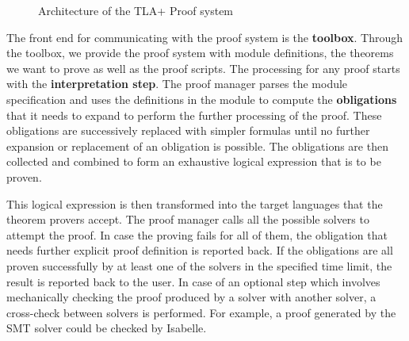 \documentclass[fleqn]{tukseminar}
\begin{document}
\begin{figure}[h]
				\caption{Architecture of the TLA+ Proof system\cite{tlapsarch}}
				\label{fig:TLAPSArch}
			\end{figure}
			
			The front end for communicating with the proof system is the \textbf{\tla toolbox}. Through the toolbox, we provide the proof system with module definitions, the theorems we want to prove as well as the proof scripts. The processing for any proof starts with the \textbf{interpretation step}. The proof manager parses the module specification and uses the definitions in the module to compute the \textbf{obligations} that it needs to expand to perform the further processing of the proof. These obligations are successively replaced with simpler formulas until no further expansion or replacement of an obligation is possible. The obligations are then collected and combined to form an exhaustive logical expression that is to be proven. 
			
			This logical expression is then transformed into the target languages that the theorem provers accept. The proof manager calls all the possible solvers to attempt the proof. In case the proving fails for all of them, the obligation that needs further explicit proof definition is reported back. If the obligations are all proven successfully by at least one of the solvers in the specified time limit, the result is reported back to the user. In case of an optional step which involves mechanically checking the proof produced by a solver with another solver, a cross-check between solvers is performed. For example, a proof generated by the SMT solver could be checked by Isabelle.
			
\end{document}
